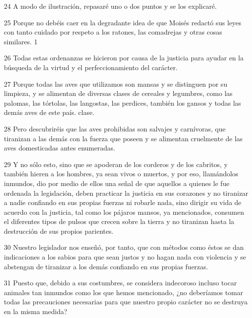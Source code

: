 \par 24 A modo de ilustración, repasaré uno o dos puntos y se los explicaré.

\par 25 Porque no debéis caer en la degradante idea de que Moisés redactó sus leyes con tanto cuidado por respeto a los ratones, las comadrejas y otras cosas similares. 1

\par 26 Todas estas ordenanzas se hicieron por causa de la justicia para ayudar en la búsqueda de la virtud y el perfeccionamiento del carácter.

\par 27 Porque todas las aves que utilizamos son mansas y se distinguen por su limpieza, y se alimentan de diversas clases de cereales y legumbres, como las palomas, las tórtolas, las langostas, las perdices, también los gansos y todas las demás aves de este país. clase.

\par 28 Pero descubriréis que las aves prohibidas son salvajes y carnívoras, que tiranizan a las demás con la fuerza que poseen y se alimentan cruelmente de las aves domesticadas antes enumeradas.

\par 29 Y no sólo esto, sino que se apoderan de los corderos y de los cabritos, y también hieren a los hombres, ya sean vivos o muertos, y por eso, llamándolos inmundos, dio por medio de ellos una señal de que aquellos a quienes le fue ordenada la legislación, deben practicar la justicia en sus corazones y no tiranizar a nadie confiando en sus propias fuerzas ni robarle nada, sino dirigir su vida de acuerdo con la justicia, tal como los pájaros mansos, ya mencionados, consumen el diferentes tipos de pulsos que crecen sobre la tierra y no tiranizan hasta la destrucción de sus propios parientes.

\par 30 Nuestro legislador nos enseñó, por tanto, que con métodos como éstos se dan indicaciones a los sabios para que sean justos y no hagan nada con violencia y se abstengan de tiranizar a los demás confiando en sus propias fuerzas.

\par 31 Puesto que, debido a sus costumbres, se considera indecoroso incluso tocar animales tan inmundos como los que hemos mencionado, ¿no deberíamos tomar todas las precauciones necesarias para que nuestro propio carácter no se destruya en la misma medida?

